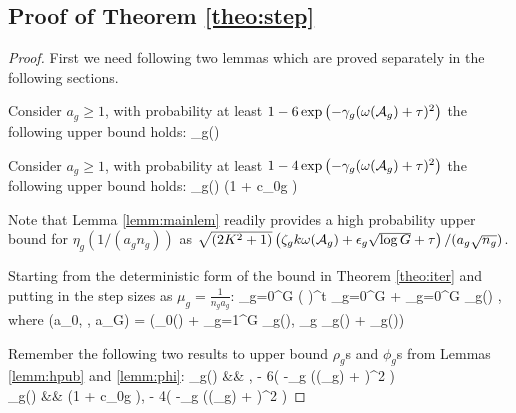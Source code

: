\subsection{Proof of Theorem \ref{theo:step}}
\label{twolems}
\begin{proof}
	First we need following two lemmas which are proved separately in the following sections. 
	
	\begin{lemma}
		\label{lemm:hpub}
		Consider $a_g \geq 1$, with probability at least $1 - 6\exp\left( -\gamma_g (\omega({\cal A}_g) + \tau)^2  \right)$ the following upper bound holds:
		\be 
		\rho_g\left(\right) \leq {}  
		\ee
	\end{lemma}
	
	
	
	\begin{lemma}
		\label{lemm:phi}
		Consider $a_g \geq 1$, with probability at least $1 - 4\exp\left( -\gamma_g (\omega({\cal A}_g) + \tau)^2 \right)$ the following upper bound holds:
		\be 
		\phi_g\left(\right) \leq {}  \left(1 + c_{0g} \right)
		\ee
	\end{lemma}
	Note that Lemma \ref{lemm:mainlem} readily provides a high probability upper bound for $\eta_g(1/(a_g n_g))$ as $\sqrt{(2K^2 + 1)} \left(\zeta_g k \omega({\cal A}_g) + \epsilon_g \sqrt{\log G} +  \tau \right)/(a_g \sqrt{n_g})$.
	
	Starting from the deterministic form of the bound in Theorem \ref{theo:iter} and putting in the step sizes as $\mu_g = \frac{1}{n_g a_g}$:
	\be 
	\label{eq:deterOpt}
	\sum_{g=0}^{G}  \norm{\ddelta_g^{(t+1)}}{2}
	\leq ( \rho)^t \sum_{g=0}^{G}   +    \sum_{g=0}^{G}  \eta_g\left(\right) ,  
	\ee 
	where 
	\be
	\label{eq:rhoss}
	\rho(a_0, \cdots, a_G) = \max\left(\rho_0\left(\right) + \sum_{g=1}^{G}  \phi_g\left(\right), \max_{g \in [G]} \rho_g\left(\right) +  \phi_g\left(\right)\right)
	\ee
	
	
	Remember the following two results to upper bound $\rho_g$s  and $\phi_g$s from Lemmas \ref{lemm:hpub} and \ref{lemm:phi}: 
	\be 
	\nr 
	\rho_g\left(\right) &\leq&   , \quad {}  - 6\exp\left( -\gamma_g (\omega(\cA_g) + \tau)^2  \right)
	\\ \nr 
	\phi_g\left(\right) &\leq&   \left(1 + c_{0g} \right), \quad {}  - 4\exp\left( -\gamma_g (\omega(\cA_g) + \tau)^2  \right)
	\ee  
	

\end{proof}
